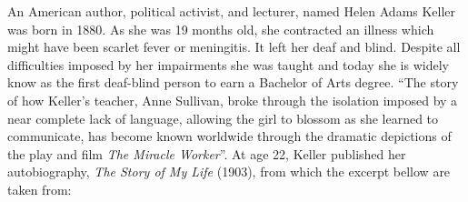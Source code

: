
An American author, political activist, and lecturer, named Helen Adams Keller was born in 1880. 
As she was 19 months old, she contracted an illness which might have been scarlet fever or meningitis. 
It left her deaf and blind. Despite all difficulties imposed by her impairments she was taught and today 
she is widely know as the first deaf-blind person to earn a Bachelor of Arts degree. 
``The story of how Keller's teacher, Anne Sullivan, broke through the isolation imposed by a near 
complete lack of language, allowing the girl to blossom as she learned to communicate, has become known worldwide 
through the dramatic depictions of the play and film \textit{The Miracle Worker}''. 
At age 22, Keller published her autobiography, \textit{The Story of My Life} (1903), from which the excerpt bellow are taken from:

